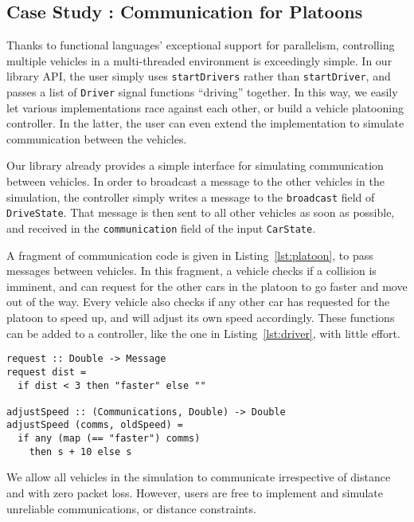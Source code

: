 \subsection{Case Study : Communication for Platoons}

Thanks to functional languages' exceptional support for parallelism, controlling multiple vehicles in a multi-threaded environment is exceedingly simple. 
In our library API, the user simply uses \texttt{startDrivers} rather than \texttt{startDriver}, and passes a list of \texttt{Driver} signal functions ``driving'' together.
In this way, we easily let various implementations race against each other, or build a vehicle platooning controller.
In the latter, the user can even extend the implementation to simulate communication between the vehicles.

Our library already provides a simple interface for simulating communication between vehicles.
In order to broadcast a message to the other vehicles in the simulation, the controller simply writes a message to the \texttt{broadcast} field of \texttt{DriveState}.
That message is then sent to all other vehicles as soon as possible, and received in the \texttt{communication} field of the input \texttt{CarState}.

A fragment of communication code is given in Listing~\ref{lst:platoon}, to pass messages between vehicles. 
In this fragment, a vehicle checks if a collision is imminent, and can request for the other cars in the platoon to go faster and move out of the way.
Every vehicle also checks if any other car has requested for the platoon to speed up, and will adjust its own speed accordingly.
These functions can be added to a controller, like the one in Listing~\ref{lst:driver}, with little effort.

\begin{lstlisting}[float,floatplacement=T,caption=Communicating between controllers, label=lst:platoon]
request :: Double -> Message
request dist = 
  if dist < 3 then "faster" else ""

adjustSpeed :: (Communications, Double) -> Double
adjustSpeed (comms, oldSpeed) =
  if any (map (== "faster") comms)
    then s + 10 else s
\end{lstlisting}

We allow all vehicles in the simulation to communicate irrespective of distance and with zero packet loss.
However, users are free to implement and simulate unreliable communications, or distance constraints.  

